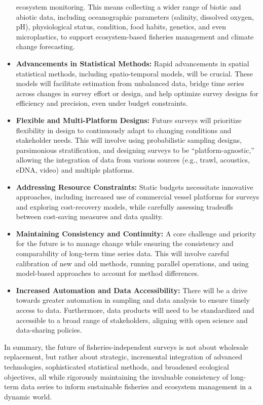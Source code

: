 \documentclass[
  letterpaper,
  oneside,
  open=any]{scrbook}
\begin{document}
\begin{itemize}
  ecosystem monitoring. This means collecting a wider range of biotic
  and abiotic data, including oceanographic parameters (salinity,
  dissolved oxygen, pH), physiological status, condition, food habits,
  genetics, and even microplastics, to support ecosystem-based fisheries
  management and climate change forecasting.
\item
  \textbf{Advancements in Statistical Methods:} Rapid advancements in
  spatial statistical methods, including spatio-temporal models, will be
  crucial. These models will facilitate estimation from unbalanced data,
  bridge time series across changes in survey effort or design, and help
  optimize survey designs for efficiency and precision, even under
  budget constraints.
\item
  \textbf{Flexible and Multi-Platform Designs:} Future surveys will
  prioritize flexibility in design to continuously adapt to changing
  conditions and stakeholder needs. This will involve using
  probabilistic sampling designs, parsimonious stratification, and
  designing surveys to be ``platform-agnostic,'' allowing the
  integration of data from various sources (e.g., trawl, acoustics,
  eDNA, video) and multiple platforms.
\item
  \textbf{Addressing Resource Constraints:} Static budgets necessitate
  innovative approaches, including increased use of commercial vessel
  platforms for surveys and exploring cost-recovery models, while
  carefully assessing tradeoffs between cost-saving measures and data
  quality.
\item
  \textbf{Maintaining Consistency and Continuity:} A core challenge and
  priority for the future is to manage change while ensuring the
  consistency and comparability of long-term time series data. This will
  involve careful calibration of new and old methods, running parallel
  operations, and using model-based approaches to account for method
  differences.
\item
  \textbf{Increased Automation and Data Accessibility:} There will be a
  drive towards greater automation in sampling and data analysis to
  ensure timely access to data. Furthermore, data products will need to
  be standardized and accessible to a broad range of stakeholders,
  aligning with open science and data-sharing policies.
\end{itemize}

In summary, the future of fisheries-independent surveys is not about
wholesale replacement, but rather about strategic, incremental
integration of advanced technologies, sophisticated statistical methods,
and broadened ecological objectives, all while rigorously maintaining
the invaluable consistency of long-term data series to inform
sustainable fisheries and ecosystem management in a dynamic world.
\end{document}
